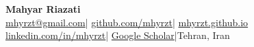 \begin{center}
  {\fontsize{24}{27}\selectfont\bfseries Mahyar Riazati}\\[6pt]
  \href{mailto:mhyrzt@gmail.com}{mhyrzt@gmail.com}\enspace|\enspace
  \href{https://github.com/mhyrzt}{github.com/mhyrzt}\enspace|\enspace
  \href{https://mhyrzt.github.io}{mhyrzt.github.io}\\[2pt]
  \href{https://www.linkedin.com/in/mhyrzt}{linkedin.com/in/mhyrzt}\enspace|\enspace
  \href{https://scholar.google.com/citations?user=k-nwlcYAAAAJ}{Google Scholar}\enspace|\enspace Tehran, Iran
\end{center}
